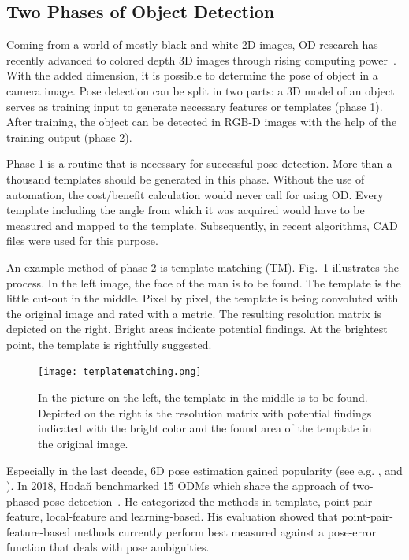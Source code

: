 \subsection{Two Phases of Object Detection}
Coming from a world of mostly black and white 2D images, OD research has recently advanced to colored depth 3D images through rising computing power~\cite{Hornberg2017HandbookVision}. With the added dimension, it is possible to determine the pose of object in a camera image. Pose detection can be split in two parts: a 3D model of an object serves as training input to generate necessary features or templates (phase 1).  After training, the object can be detected in RGB-D images with the help of the training output (phase 2). 

Phase 1 is a routine that is necessary for successful pose detection. More than a thousand templates should be generated in this phase. Without the use of automation, the cost/benefit calculation would never call for using OD. Every template including the angle from which it was acquired would have to be measured and mapped to the template. Subsequently, in recent algorithms, CAD files were used for this purpose. 

An example method of phase 2 is template matching (TM). Fig.~\ref{templatematching} illustrates the process. In the left image, the face of the man is to be found. The template is the little cut-out in the middle. Pixel by pixel, the template is being convoluted with the original image and rated with a metric. The resulting resolution matrix is depicted on the right. Bright areas indicate potential findings. At the brightest point, the template is rightfully suggested.~\cite{OpenCV-Documentation2018Template2018}

\begin{figure}[ht]
	\centering
  \texttt{[image: templatematching.png]}
	\caption[Template Matching]{In the picture on the left, the template in the middle is to be found. Depicted on the right is the resolution matrix with potential findings indicated with the bright color and the found area of the template in the original image.~\cite{OpenCV-Documentation2018Template2018}}
	\label{templatematching}
\end{figure}

Especially in the last decade, 6D pose estimation gained popularity (see e.g. \cite{Drost2010ModelRecognition}, \cite{Sundermeyer2018ImplicitImages} and \cite{Hinterstoisser2013ModelScenes}). In 2018, Hodaň benchmarked 15 ODMs which share the approach of two-phased pose detection~\cite{Hodan2018BOP:Estimation}. He categorized the methods in template, point-pair-feature, local-feature and learning-based. His evaluation showed that point-pair-feature-based methods currently perform best measured against a pose-error function that deals with pose ambiguities.

